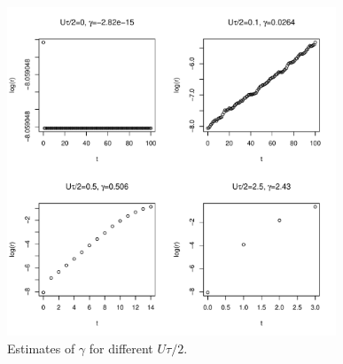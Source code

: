 \begin{figure}[H]
\begin{centering}
\includegraphics[width=0.875\textwidth]{../code/figure/gamma_for_different_Utot.pdf}
\par\end{centering}
\caption{Estimates of $\gamma$ for different $U\tau/2$.\label{fig:gamma_Utot}}
\end{figure}

